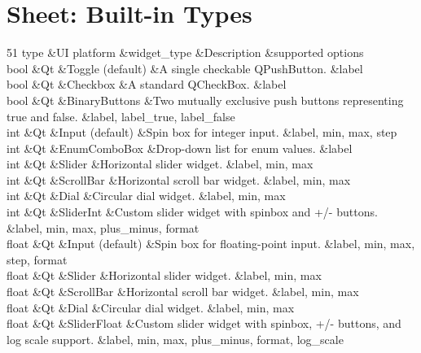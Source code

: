 \chapter{Sheet\+: Built-\/in Types }
\hypertarget{md_docs_2builtin__types}{}\label{md_docs_2builtin__types}
\label{md_docs_2builtin__types_autotoc_md2}%
%



\begin{DoxyTable}{5}{}{}{1}
type  &UI platform  &widget\+\_\+type  &Description  &supported options  \\
bool  &Qt  &Toggle (default)  &A single checkable QPush\+Button.  &label  \\
bool  &Qt  &Checkbox  &A standard QCheck\+Box.  &label  \\
bool  &Qt  &Binary\+Buttons  &Two mutually exclusive push buttons representing true and false.  &label, label\+\_\+true, label\+\_\+false  \\
int  &Qt  &Input (default)  &Spin box for integer input.  &label, min, max, step  \\
int  &Qt  &Enum\+Combo\+Box  &Drop-\/down list for enum values.  &label  \\
int  &Qt  &Slider  &Horizontal slider widget.  &label, min, max  \\
int  &Qt  &Scroll\+Bar  &Horizontal scroll bar widget.  &label, min, max  \\
int  &Qt  &Dial  &Circular dial widget.  &label, min, max  \\
int  &Qt  &Slider\+Int  &Custom slider widget with spinbox and +/-\/ buttons.  &label, min, max, plus\+\_\+minus, format  \\
float  &Qt  &Input (default)  &Spin box for floating-\/point input.  &label, min, max, step, format  \\
float  &Qt  &Slider  &Horizontal slider widget.  &label, min, max  \\
float  &Qt  &Scroll\+Bar  &Horizontal scroll bar widget.  &label, min, max  \\
float  &Qt  &Dial  &Circular dial widget.  &label, min, max  \\
float  &Qt  &Slider\+Float  &Custom slider widget with spinbox, +/-\/ buttons, and log scale support.  &label, min, max, plus\+\_\+minus, format, log\+\_\+scale  \\

\end{DoxyTable}
